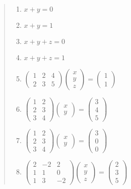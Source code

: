 \documentclass[twocolumn,11pt]{jarticle}
\begin{document}
\begin{quote}
\begin{enumerate}
  \def\labelenumi{(\alph{enumi})}
\item $x+y=0$
\item $x+y=1$
\item $x+y+z=0$
\item $x+y+z=1$
\item $
  \begin{pmatrix}
    1& 2 & 4\\
    2& 3 & 5
  \end{pmatrix}
  \begin{pmatrix}
    x \\ y \\z
  \end{pmatrix}
  =
  \begin{pmatrix}
    1 \\ 1
  \end{pmatrix}$
\item $
  \begin{pmatrix}
    1 & 2\\
    2 & 3\\
    3 & 4
  \end{pmatrix}
  \begin{pmatrix}
    x \\ y
  \end{pmatrix}
  =
  \begin{pmatrix}
    3 \\ 4 \\ 5
  \end{pmatrix}$
\item $
  \begin{pmatrix}
    1 & 2\\
    2 & 3\\
    3 & 4
  \end{pmatrix}
  \begin{pmatrix}
    x \\ y
  \end{pmatrix}
  =
  \begin{pmatrix}
    3 \\ 0 \\ 0
  \end{pmatrix}$
\item $
  \begin{pmatrix}
    2 & -2 & 2\\1 & 1 & 0\\1 & 3 & -2
  \end{pmatrix}
  \begin{pmatrix}
    x \\ y \\z
  \end{pmatrix}
  =
  \begin{pmatrix}
    2 \\ 3 \\ 5
  \end{pmatrix}
  $
\end{enumerate}
\end{quote}
\end{document}
